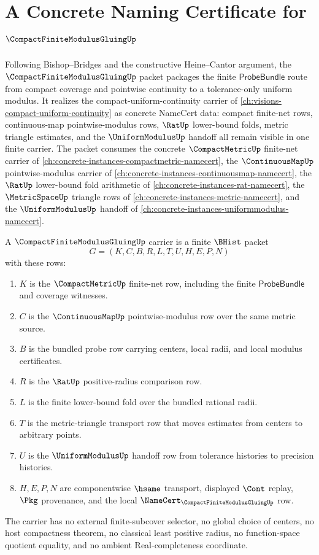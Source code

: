 \chapter{A Concrete Naming Certificate for $\CompactFiniteModulusGluingUp$}
\label{ch:concrete-instances-compact-finite-modulus-gluing-namecert}

Following Bishop--Bridges and the constructive Heine--Cantor argument, the $\CompactFiniteModulusGluingUp$ packet packages the finite $\mathsf{ProbeBundle}$ route from compact coverage and pointwise continuity to a tolerance-only uniform modulus. It realizes the compact-uniform-continuity carrier of \autoref{ch:visions-compact-uniform-continuity} as concrete NameCert data: compact finite-net rows, continuous-map pointwise-modulus rows, $\RatUp$ lower-bound folds, metric triangle estimates, and the $\UniformModulusUp$ handoff all remain visible in one finite carrier.
The packet consumes the concrete $\CompactMetricUp$ finite-net carrier of \autoref{ch:concrete-instances-compactmetric-namecert}, the $\ContinuousMapUp$ pointwise-modulus carrier of \autoref{ch:concrete-instances-continuousmap-namecert}, the $\RatUp$ lower-bound fold arithmetic of \autoref{ch:concrete-instances-rat-namecert}, the $\MetricSpaceUp$ triangle rows of \autoref{ch:concrete-instances-metric-namecert}, and the $\UniformModulusUp$ handoff of \autoref{ch:concrete-instances-uniformmodulus-namecert}.

\begin{definition}
\label{def:compact-finite-modulus-gluing-carrier}
A $\CompactFiniteModulusGluingUp$ carrier is a finite $\BHist$ packet
$$
G=(K,C,B,R,L,T,U,H,E,P,N)
$$
with these rows:
\begin{enumerate}
\item $K$ is the $\CompactMetricUp$ finite-net row, including the finite $\mathsf{ProbeBundle}$ and coverage witnesses.
\item $C$ is the $\ContinuousMapUp$ pointwise-modulus row over the same metric source.
\item $B$ is the bundled probe row carrying centers, local radii, and local modulus certificates.
\item $R$ is the $\RatUp$ positive-radius comparison row.
\item $L$ is the finite lower-bound fold over the bundled rational radii.
\item $T$ is the metric-triangle transport row that moves estimates from centers to arbitrary points.
\item $U$ is the $\UniformModulusUp$ handoff row from tolerance histories to precision histories.
\item $H,E,P,N$ are componentwise $\hsame$ transport, displayed $\Cont$ replay, $\Pkg$ provenance, and the local $\NameCert_{\CompactFiniteModulusGluingUp}$ row.
\end{enumerate}
The carrier has no external finite-subcover selector, no global choice of centers, no host compactness theorem, no classical least positive radius, no function-space quotient equality, and no ambient Real-completeness coordinate.
\end{definition}


